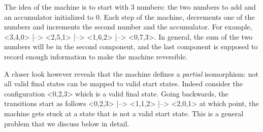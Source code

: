 \documentclass{llncs}
\begin{document}
The idea of the machine is to start with 3 numbers: the two numbers to add
and an accumulator initialized to 0. Each step of the machine, decrements one
of the numbers and increments the second number and the accumulator. For
example, {{<3,4,0> |--> <2,5,1> |--> <1,6,2> |--> <0,7,3>}}. In general, the
sum of the two numbers will be in the second component, and the last
component is supposed to record enough information to make the machine
reversible.

A closer look however reveals that the machine defines a
\emph{partial} isomorphism: not all valid final states can be mapped
to valid start states. Indeed consider the configuration {{<0,2,3>}}
which is a valid final state. Going backwards, the transitions start
as follows {{<0,2,3> |--> <1,1,2> |--> <2,0,1>}} at which point, the
machine gets stuck at a state that is not a valid start state. This 
is a general problem that we discuss below in detail. 
\end{document}
